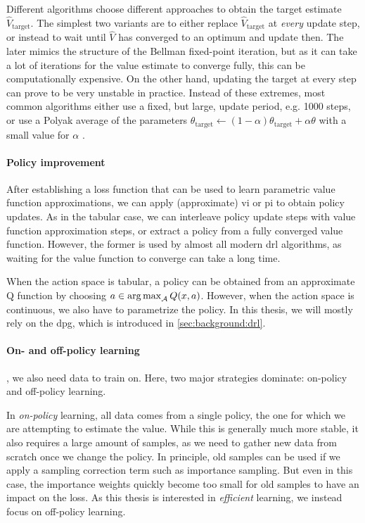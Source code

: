 Different algorithms choose different approaches to obtain the target estimate $\hat{V}_\mathrm{target}$.
The simplest two variants are to either replace $\hat{V}_\mathrm{target}$ at \emph{every} update step, or instead to wait until $\hat{V}$ has converged to an optimum and update then.
The later mimics the structure of the Bellman fixed-point iteration, but as it can take a lot of iterations for the value estimate to converge fully, this can be computationally expensive.
On the other hand, updating the target at every step can prove to be very unstable in practice.
Instead of these extremes, most common algorithms either use a fixed, but large, update period, e.g. 1000 steps, \parencite{dqn} or use a Polyak average of the parameters $\theta_\mathrm{target} \leftarrow (1 - \alpha) \theta_\mathrm{target} + \alpha \theta$ with a small value for $\alpha$ \parencite{td3}.

\paragraph{Policy improvement}

After establishing a loss function that can be used to learn parametric value function approximations, we can apply (approximate) \ac{vi} or \ac{pi} to obtain policy updates.
As in the tabular case, we can interleave policy update steps with value function approximation steps, or extract a policy from a fully converged value function.
However, the former is used by almost all modern \ac{drl} algorithms, as waiting for the value function to converge can take a long time.

When the action space is tabular, a policy can be obtained from an approximate Q function by choosing $a \in \operatorname*{arg\,max}_{\mathcal{A}} Q(x,a)$.
However, when the action space is continuous, we also have to parametrize the policy.
In this thesis, we will mostly rely on the \ac{dpg}, which is introduced in \autoref{sec:background:drl}.

\paragraph{On- and off-policy learning}

, we also need data to train on.
Here, two major strategies dominate: on-policy and off-policy learning.

In \emph{on-policy} learning, all data comes from a single policy, the one for which we are attempting to estimate the value.
While this is generally much more stable, it also requires a large amount of samples, as we need to gather new data from scratch once we change the policy.
In principle, old samples can be used if we apply a sampling correction term such as importance sampling.
But even in this case, the importance weights quickly become too small for old samples to have an impact on the loss.
As this thesis is interested in \emph{efficient} learning, we instead focus on off-policy learning.

